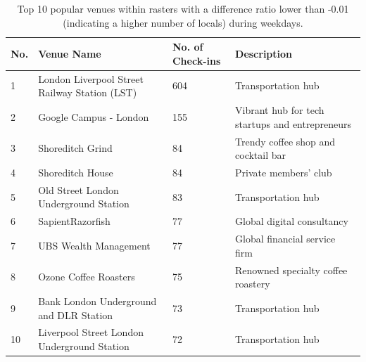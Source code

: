 \documentclass{article}
\begin{document}
\begin{table}[!h]
\centering
\caption{\label{tab:popular_venues_localspop_weekday}Top 10 popular venues within rasters with a difference ratio lower than -0.01 (indicating a higher number of locals) during weekdays.}
\begin{adjustbox}{max width=\textwidth, margin=0cm}
\begin{threeparttable}
\begin{tabular}{lp{5cm}lp{4cm}} \hline
No. & Venue Name & No. of Check-ins & Description \\ \hline
1 & London Liverpool Street Railway Station (LST) & 604 & Transportation hub \\
2 & Google Campus - London & 155 & Vibrant hub for tech startups and entrepreneurs \\
3 & Shoreditch Grind & 84 & Trendy coffee shop and cocktail bar \\
4 & Shoreditch House & 84 & Private members' club \\
5 & Old Street London Underground Station & 83 & Transportation hub \\
6 & SapientRazorfish & 77 & Global digital consultancy \\
7 & UBS Wealth Management & 77 & Global financial service firm \\
8 & Ozone Coffee Roasters & 75 & Renowned specialty coffee roastery \\
9 & Bank London Underground and DLR Station & 73 & Transportation hub \\
10 & Liverpool Street London Underground Station & 72 & Transportation hub \\ \hline
\end{tabular}
\end{threeparttable}
\end{adjustbox}
\end{table}
\end{document}
